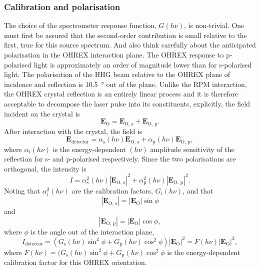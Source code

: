 \subsubsection{Calibration and polarisation}
The choice of the spectrometer response function, $G(h\nu)$, is non-trivial. One must first be assured that the second-order contribution is small relative to the first, true for this source spectrum. And also think carefully about the anticipated polarisation in the OHREX interaction plane. The OHREX response to p-polarised light is approximately an order of magnitude lower than for s-polarised light. The polarisation of the HHG beam relative to the OHREX plane of incidence and reflection is \qty{10.5}{\degree} out of the plane. Unlike the RPM interaction, the OHREX crystal reflection is an entirely linear process and it is therefore acceptable to decompose the laser pulse into its constituents, explicitly, the field incident on the crystal is
\begin{equation}
	\mathbf{E_\mathrm{O}} = \mathbf{E}_\mathrm{O,\, s} + \mathbf{E}_\mathrm{O,\, p}.
\end{equation}
After interaction with the crystal, the field is
\begin{equation}
	\mathbf{E}_\mathrm{detector} = \alpha_\mathrm{s}(h\nu)\mathbf{E}_\mathrm{O,\, s} + \alpha_\mathrm{p}(h\nu)\mathbf{E}_\mathrm{O,\, p},
\end{equation}
where $\alpha_i(h\nu)$ is the energy-dependent $(h\nu)$ amplitude sensitivity of the reflection for s- and p-polarised respectively. Since the two polarisations are orthogonal, the intensity is
\begin{equation}
	I = \alpha^2_\mathrm{s}(h\nu)|\mathbf{E}_\mathrm{O,\, s}|^2 + \alpha^2_\mathrm{p}(h\nu)|\mathbf{E}_\mathrm{O,\, p}|^2.
\end{equation}
Noting that $\alpha^2_i(h\nu)$ are the calibration factors, $G_i(h\nu)$, and that
\begin{equation}
	|\mathbf{E}_\mathrm{O,\, s}| = |\mathbf{E_\mathrm{O}}|\sin\phi
\end{equation}
and
\begin{equation}
	|\mathbf{E}_\mathrm{O,\, p}| = |\mathbf{E_\mathrm{O}}|\cos\phi,
\end{equation}
where $\phi$ is the angle out of the interaction plane,
\begin{equation}
	I_\mathrm{detector} = (G_\mathrm{s}(h\nu)\sin^2\phi + G_\mathrm{p}(h\nu)\cos^2\phi)|\mathbf{E_\mathrm{O}}|^2 = F(h\nu)|\mathbf{E_\mathrm{O}}|^2,
\end{equation}
where $F(h\nu) =  (G_\mathrm{s}(h\nu)\sin^2\phi + G_\mathrm{p}(h\nu)\cos^2\phi$ is the energy-dependent calibration factor for this OHREX orientation.

